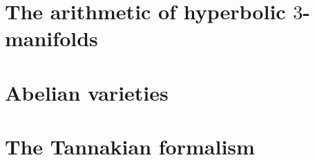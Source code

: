         \begin{appendices}
            \chapter{The arithmetic of hyperbolic \texorpdfstring{$3$}{}-manifolds}
                \begin{abstract}
                    
                \end{abstract}
                
                \minitoc
                
                
                
                
                
                
                
                
                
            \chapter{Abelian varieties}
                \begin{abstract}
                    
                \end{abstract}
                
                \minitoc
                
                
                
                
                
                
                
            \chapter{The Tannakian formalism}
                \begin{abstract}
                    
                \end{abstract}
                
                \minitoc
                
                
                
                
        \end{appendices}
	
	\printbibliography


